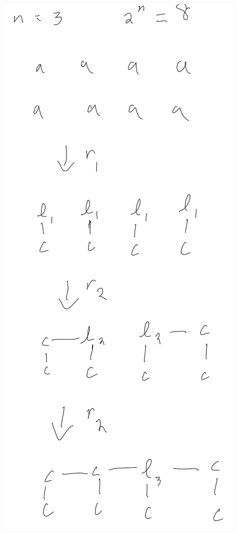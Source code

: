 \documentclass[]{article}
\numberwithin{equation}{section}
\begin{document}
\begin{multicols}{3}
    \includegraphics[width=\columnwidth]{figs/pblm6_3.png}

\end{multicols}
\end{document}
